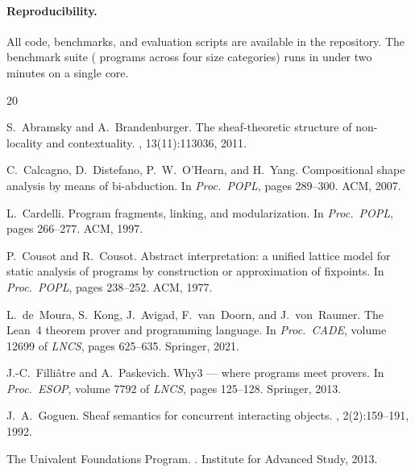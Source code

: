 \documentclass[11pt]{article}
\begin{document}
\paragraph{Reproducibility.}
All code, benchmarks, and evaluation scripts are available in the \JuGeo{}
repository.  The benchmark suite (\compTotalPrograms{} programs across four
size categories) runs in under two minutes on a single core.

\begingroup
\raggedright
\begin{thebibliography}{20}

S.~Abramsky and A.~Brandenburger.
\newblock The sheaf-theoretic structure of non-locality and contextuality.
, 13(11):113036, 2011.

C.~Calcagno, D.~Distefano, P.~W.~O'Hearn, and H.~Yang.
\newblock Compositional shape analysis by means of bi-abduction.
\newblock In {\em Proc.\ POPL}, pages 289--300. ACM, 2007.

L.~Cardelli.
\newblock Program fragments, linking, and modularization.
\newblock In {\em Proc.\ POPL}, pages 266--277. ACM, 1997.

P.~Cousot and R.~Cousot.
\newblock Abstract interpretation: a unified lattice model for static analysis
  of programs by construction or approximation of fixpoints.
\newblock In {\em Proc.\ POPL}, pages 238--252. ACM, 1977.

L.~de~Moura, S.~Kong, J.~Avigad, F.~van~Doorn, and J.~von~Raumer.
\newblock The {Lean~4} theorem prover and programming language.
\newblock In {\em Proc.\ CADE}, volume 12699 of {\em LNCS}, pages 625--635.
  Springer, 2021.

J.-C.~Filli\^atre and A.~Paskevich.
\newblock Why3 --- where programs meet provers.
\newblock In {\em Proc.\ ESOP}, volume 7792 of {\em LNCS}, pages 125--128.
  Springer, 2013.

J.~A.~Goguen.
\newblock Sheaf semantics for concurrent interacting objects.
, 2(2):159--191,
  1992.

The {Univalent Foundations Program}.
.
\newblock Institute for Advanced Study, 2013.


\end{thebibliography}
\end{document}
